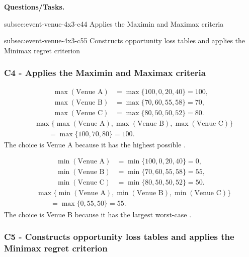 	\textbf{Questions/Tasks.}
	\begin{enumerate}
		\CriterionTask
		{subsec:event-venue-4x3-c4}{4}
		{Applies the Maximin and Maximax criteria}

		\CriterionTask
		{subsec:event-venue-4x3-c5}{5}
		{Constructs opportunity loss tables and applies the Minimax regret criterion}
	\end{enumerate}
	
	\subsubsection*{C4 - Applies the Maximin and Maximax criteria}
	\label{subsec:event-venue-4x3-c4}
	
	\[
	\begin{aligned}
		\max(\text{Venue A}) &= \max\{100,0,20,40\}=100,\\
		\max(\text{Venue B}) &= \max\{70,60,55,58\}=70,\\
		\max(\text{Venue C}) &= \max\{80,50,50,52\}=80.
	\end{aligned}
	\]
	\[
	\begin{aligned}
		&\max\{\max(\text{Venue A}),\max(\text{Venue B}),
		\max(\text{Venue C})\}\\
		&\qquad=\max\{100,70,80\}
		=100.
	\end{aligned}
	\]
	The  choice is Venue A because it has the highest possible .
	
	\[
	\begin{aligned}
		\min(\text{Venue A}) &= \min\{100,0,20,40\}=0,\\
		\min(\text{Venue B}) &= \min\{70,60,55,58\}=55,\\
		\min(\text{Venue C}) &= \min\{80,50,50,52\}=50.
	\end{aligned}
	\]
	\[
	\begin{aligned}
		&\max\{\min(\text{Venue A}),\min(\text{Venue B}),
		\min(\text{Venue C})\}\\
		&\qquad=\max\{0,55,50\}
		=55.
	\end{aligned}
	\]
	The  choice is Venue B because it has the largest worst-case .
	
	\subsubsection*{C5 - Constructs opportunity loss tables and applies the Minimax regret criterion}
	\label{subsec:event-venue-4x3-c5}
	
